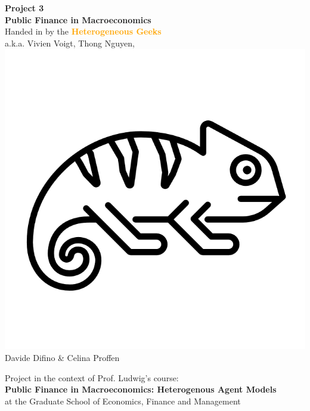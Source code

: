 \documentclass[12pt,a4paper]{article}
\begin{document}
\begin{center}
       \vspace*{1cm}
       \huge\textbf{Project 3} \\
       \vspace{0.4cm}
       \large \textbf{Public Finance in Macroeconomics} \\
       \vspace{0.5cm}
        \large Handed in by the \textcolor{orange}{\textbf{Heterogeneous Geeks}} \\
        \vspace{0.3cm}
        a.k.a. Vivien Voigt, Thong Nguyen, \includegraphics[scale=0.06]{graphs/geek.png}\\Davide Difino \& Celina Proffen \\
       \vspace{1.5cm}
       \vfill



        Project in the context of Prof. Ludwig's course: \\
        \textbf{Public Finance in Macroeconomics: Heterogenous Agent Models}\\
        at the Graduate School of Economics, Finance and Management
       \vspace{0.8cm}
   \end{center}
\end{document}
